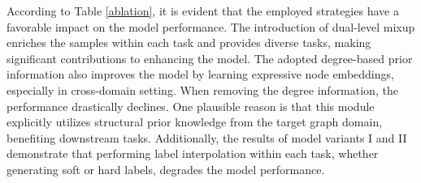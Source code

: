 According to Table \ref{ablation}, it is evident that the employed strategies have a favorable impact on the model performance. The introduction of dual-level mixup enriches the samples within each task and provides diverse tasks, making significant contributions to enhancing the model. The adopted degree-based prior information also improves the model by learning expressive node embeddings, especially in cross-domain setting. When removing the degree information, the performance drastically declines. One plausible reason is that this module explicitly utilizes structural prior knowledge from the target graph domain, benefiting downstream tasks. Additionally, the results of model variants I and II demonstrate that performing label interpolation within each task, whether generating soft or hard labels, degrades the model performance. %

